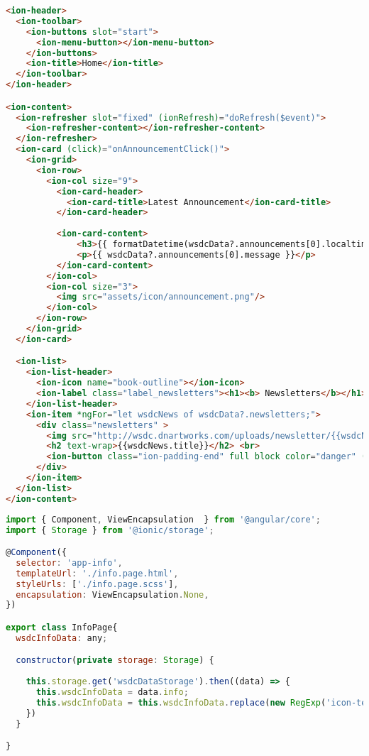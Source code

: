 \begin{lstlisting}[language=html, label={lst:home.page.html}, caption=home.page.html]
<ion-header>
  <ion-toolbar>
    <ion-buttons slot="start">
      <ion-menu-button></ion-menu-button>
    </ion-buttons>
    <ion-title>Home</ion-title>
  </ion-toolbar>
</ion-header>

<ion-content>
  <ion-refresher slot="fixed" (ionRefresh)="doRefresh($event)">
    <ion-refresher-content></ion-refresher-content>
  </ion-refresher>
  <ion-card (click)="onAnnouncementClick()">
    <ion-grid>
      <ion-row>
        <ion-col size="9">
          <ion-card-header>
            <ion-card-title>Latest Announcement</ion-card-title>
          </ion-card-header>
        
          <ion-card-content>
              <h3>{{ formatDatetime(wsdcData?.announcements[0].localtime) }}</h3>
              <p>{{ wsdcData?.announcements[0].message }}</p>
          </ion-card-content>
        </ion-col>
        <ion-col size="3">
          <img src="assets/icon/announcement.png"/>
        </ion-col>
      </ion-row>
    </ion-grid>
  </ion-card>

  <ion-list>
    <ion-list-header>
      <ion-icon name="book-outline"></ion-icon>
      <ion-label class="label_newsletters"><h1><b> Newsletters</b></h1></ion-label>
    </ion-list-header>
    <ion-item *ngFor="let wsdcNews of wsdcData?.newsletters;">
      <div class="newsletters" >
        <img src="http://wsdc.dnartworks.com/uploads/newsletter/{{wsdcNews.id}}/thumbnail.jpg">
        <h2 text-wrap>{{wsdcNews.title}}</h2> <br>
        <ion-button class="ion-padding-end" full block color="danger" (click)="launch(wsdcNews.url)">Read More</ion-button>
      </div>
    </ion-item>
  </ion-list>
</ion-content>
\end{lstlisting} 

\begin{lstlisting}[language=JavaScript, label={lst:info.page.ts}, caption=info.page.ts]
import { Component, ViewEncapsulation  } from '@angular/core';
import { Storage } from '@ionic/storage';

@Component({
  selector: 'app-info',
  templateUrl: './info.page.html',
  styleUrls: ['./info.page.scss'],
  encapsulation: ViewEncapsulation.None,
})

export class InfoPage{
  wsdcInfoData: any;

  constructor(private storage: Storage) { 
    
    this.storage.get('wsdcDataStorage').then((data) => {
      this.wsdcInfoData = data.info;
      this.wsdcInfoData = this.wsdcInfoData.replace(new RegExp('icon-telephone','g'), '<img src="assets/icon/telephone.png" alt="Telephone Icon" class="icon"/>');
    })
  }

}

\end{lstlisting} 

